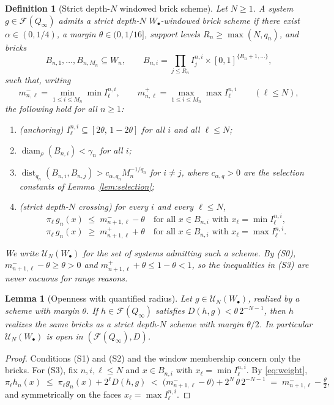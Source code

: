 \documentclass[11pt]{article}
\newtheorem{lemma}[theorem]{Lemma}
\newtheorem{definition}[theorem]{Definition}
\newcommand{\Q}{Q_\infty}
\newcommand{\F}{\mathcal{F}}
\newcommand{\dist}{\operatorname{dist}}
\newcommand{\diam}{\operatorname{diam}}
\begin{document}
\begin{definition}[Strict depth-$N$ windowed brick scheme]\label{def:scheme}
Let $N\ge1$.  A system $g\in\F(\Q)$ \emph{admits a strict depth-$N$
$W_\bullet$-windowed brick scheme} if there exist $\alpha\in(0,1/4)$, a margin
$\theta\in(0,1/16]$, support levels $R_n\ge\max(N,q_n)$, and bricks
\[
B_{n,1},\dots,B_{n,M_n}\subseteq W_n,
\qquad
B_{n,i}=\prod_{j\le R_n}I^{n,i}_j\times[0,1]^{\{R_n+1,\dots\}},
\]
such that, writing
\[
m^-_{n,\ell}=\min_{1\le i\le M_n}\min I^{n,i}_\ell,
\qquad
m^+_{n,\ell}=\max_{1\le i\le M_n}\max I^{n,i}_\ell
\qquad(\ell\le N),
\]
the following hold for all $n\ge1$:
\begin{enumerate}
\item[(S0)] (\emph{anchoring}) $I^{n,i}_\ell\subseteq[2\theta,\,1-2\theta]$ for all
$i$ and all $\ell\le N$;
\item[(S1)] $\diam_\rho(B_{n,i})<\gamma_n$ for all $i$;
\item[(S2)] $\dist_{q_n}(B_{n,i},B_{n,j})>c_{\alpha,q_n}M_n^{-1/q_n}$ for $i\ne j$,
where $c_{\alpha,q}>0$ are the selection constants of
Lemma~\ref{lem:selection};
\item[(S3)] (\emph{strict depth-$N$ crossing}) for every $i$ and every
$\ell\le N$,
\[
\pi_\ell\,g_n(x)\;\le\;m^-_{n+1,\ell}-\theta
\quad\text{for all }x\in B_{n,i}\text{ with }x_\ell=\min I^{n,i}_\ell,
\]
\[
\pi_\ell\,g_n(x)\;\ge\;m^+_{n+1,\ell}+\theta
\quad\text{for all }x\in B_{n,i}\text{ with }x_\ell=\max I^{n,i}_\ell .
\]
\end{enumerate}
We write $\mathcal U_N(W_\bullet)$ for the set of systems admitting such a scheme.
By (S0), $m^-_{n+1,\ell}-\theta\ge\theta>0$ and $m^+_{n+1,\ell}+\theta\le1-\theta<1$,
so the inequalities in (S3) are never vacuous for range reasons.
\end{definition}

\begin{lemma}[Openness with quantified radius]\label{lem:open}
Let $g\in\mathcal U_N(W_\bullet)$, realized by a scheme with margin $\theta$.  If
$h\in\F(\Q)$ satisfies $D(h,g)<\theta\,2^{-N-1}$, then $h$ realizes the \emph{same}
bricks as a strict depth-$N$ scheme with margin $\theta/2$.  In particular
$\mathcal U_N(W_\bullet)$ is open in $(\F(\Q),D)$.
\end{lemma}

\begin{proof}
Conditions (S1) and (S2) and the window membership concern only the bricks.  For (S3),
fix $n,i,\ell\le N$ and $x\in B_{n,i}$ with $x_\ell=\min I^{n,i}_\ell$.  By
\eqref{eq:weight},
\[
\pi_\ell h_n(x)\;\le\;\pi_\ell g_n(x)+2^{\ell}D(h,g)
\;<\;\bigl(m^-_{n+1,\ell}-\theta\bigr)+2^{N}\,\theta\,2^{-N-1}
\;=\;m^-_{n+1,\ell}-\tfrac{\theta}{2},
\]
and symmetrically on the faces $x_\ell=\max I^{n,i}_\ell$.
\end{proof}
\end{document}
